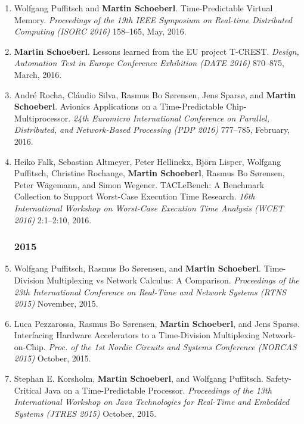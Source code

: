\begin{enumerate}
\item Wolfgang Puffitsch and {\bf Martin Schoeberl}.
 Time-Predictable Virtual Memory.
 \emph{Proceedings of the 19th IEEE Symposium on Real-time Distributed Computing (ISORC 2016)} 158--165, May, 2016.

\item {\bf Martin Schoeberl}.
 Lessons learned from the EU project T-CREST.
 \emph{Design, Automation Test in Europe Conference Exhibition (DATE 2016)} 870--875, March, 2016.

\item Andr{\'e} Rocha, Cl{\'a}udio Silva, Rasmus Bo S{\o}rensen, Jens Spars{\o}, and {\bf Martin Schoeberl}.
 Avionics Applications on a Time-Predictable Chip-Multiprocessor.
 \emph{24th Euromicro International Conference on Parallel, Distributed, and Network-Based Processing (PDP 2016)} 777--785, February, 2016.

\item Heiko Falk, Sebastian Altmeyer, Peter Hellinckx, Bj{\"o}rn Lisper, Wolfgang Puffitsch, Christine Rochange, {\bf Martin Schoeberl}, Rasmus Bo S{\o}rensen, Peter W{\"a}gemann, and Simon Wegener.
 TACLeBench: A Benchmark Collection to Support Worst-Case Execution Time Research.
 \emph{16th International Workshop on Worst-Case Execution Time Analysis (WCET 2016)} 2:1--2:10, 2016.


\subsubsection*{2015}

\item Wolfgang Puffitsch, Rasmus Bo S{\o}rensen, and {\bf Martin Schoeberl}.
 Time-Division Multiplexing vs Network Calculus: A Comparison.
 \emph{Proceedings of the 23th International Conference on Real-Time and Network Systems (RTNS 2015)} November, 2015.

\item Luca Pezzarossa, Rasmus Bo S{\o}rensen, {\bf Martin Schoeberl}, and Jens Spars{\o}.
 Interfacing Hardware Accelerators to a Time-Division Multiplexing Network-on-Chip.
 \emph{Proc. of the 1st Nordic Circuits and Systems Conference (NORCAS 2015)} October, 2015.

\item Stephan E. Korsholm, {\bf Martin Schoeberl}, and Wolfgang Puffitsch.
 Safety-Critical Java on a Time-Predictable Processor.
 \emph{Proceedings of the 13th International Workshop on Java Technologies for Real-Time and Embedded Systems (JTRES 2015)} October, 2015.


\end{enumerate}
